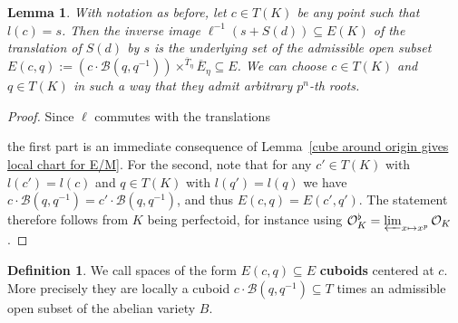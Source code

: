 \documentclass[10pt,oneside]{amsart}
\newtheorem{lemma}[theorem]{Lemma}
\theoremstyle{definition}
\newtheorem{definition}[theorem]{Definition}
\theoremstyle{remark}
\begin{document}
	\begin{lemma}\label{cube around point gives local chart for E/M}
		With notation as before, let $c \in T(K)$ be any point such that $l(c)=s$. Then the inverse image $\ell^{-1}(s+S(d))\subseteq E(K)$ of the translation of $S(d)$ by $s$ is the underlying set of the admissible open subset $E(c,q) := (c\cdot \mathcal B(q,q^{-1}))\times^{\overline{T}_\eta}\overline{E}_\eta \subseteq E$. We can choose $c\in T(K)$ and $q\in T(K)$ in such a way that they admit arbitrary $p^n$-th roots.
	\end{lemma}
	
	\begin{proof}
		Since $\ell$ commutes with the translations
		\begin{center}
		\end{center}
		the first part is an immediate consequence of Lemma~\ref{cube around origin gives local chart for E/M}. For the second, note that for any $c'\in T(K)$ with $l(c')=l(c)$ and $q\in T(K)$ with $l(q')=l(q)$ we have $c\cdot \mathcal B(q,q^{-1}) = c'\cdot \mathcal B(q,q^{-1})$, and thus $E(c,q)=E(c',q')$. The statement therefore follows from $K$ being perfectoid, for instance using $\mathcal O_K^\flat = \varprojlim_{x\mapsto x^p}\mathcal O_K$.
	\end{proof}
    
    \begin{definition}\label{defininition of cuboid}
		We call spaces of the form $E(c,q)\subseteq E$ \textbf{cuboids} centered at $c$. More precisely they are locally a cuboid   $c\cdot\mathcal B(q,q^{-1})\subseteq T$ times an admissible open subset of the abelian variety $B$. 
	\end{definition}
    
\end{document}
